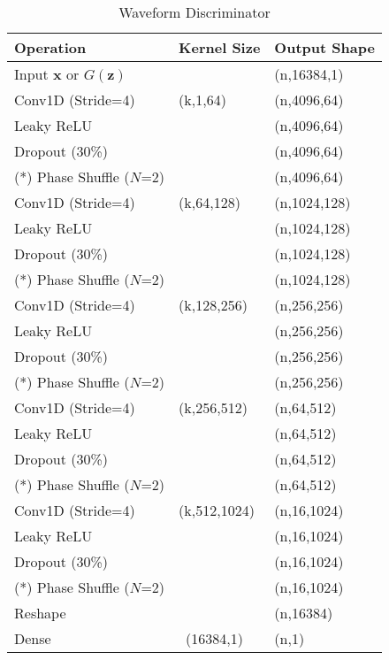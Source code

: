 \begin{table}[h]
\caption{Waveform Discriminator}\label{wavegan_disc}
\centering
\begin{tabular}{l|l|l}
Operation & Kernel Size & Output Shape \\ \hline
Input $\boldsymbol{x}$ or $G(\boldsymbol z)$ & \  & (n,16384,1)\\
Conv1D (Stride=4) & (k,1,64) & (n,4096,64)\\
Leaky ReLU & \ & (n,4096,64) \\
Dropout (30\%) & \ & (n,4096,64)\\
(*) Phase Shuffle ($N$=2) & \ & (n,4096,64)\\
Conv1D (Stride=4) & (k,64,128) & (n,1024,128)\\
Leaky ReLU & \ & (n,1024,128) \\
Dropout (30\%) & \ & (n,1024,128)\\
(*) Phase Shuffle ($N$=2) & \ & (n,1024,128)\\
Conv1D (Stride=4) & (k,128,256) & (n,256,256)\\
Leaky ReLU & \ & (n,256,256) \\
Dropout (30\%) & \ & (n,256,256)\\
(*) Phase Shuffle ($N$=2) & \ & (n,256,256)\\
Conv1D (Stride=4) & (k,256,512) & (n,64,512)\\
Leaky ReLU & \ & (n,64,512) \\
Dropout (30\%) & \ & (n,64,512)\\
(*) Phase Shuffle ($N$=2) & \ & (n,64,512)\\
Conv1D (Stride=4) & (k,512,1024) & (n,16,1024)\\
Leaky ReLU & \ & (n,16,1024) \\
Dropout (30\%) & \ & (n,16,1024)\\
(*) Phase Shuffle ($N$=2) & \ & (n,16,1024)\\
Reshape &\ & (n,16384)\\
Dense &\ (16384,1) & (n,1)
\end{tabular}
\end{table}





